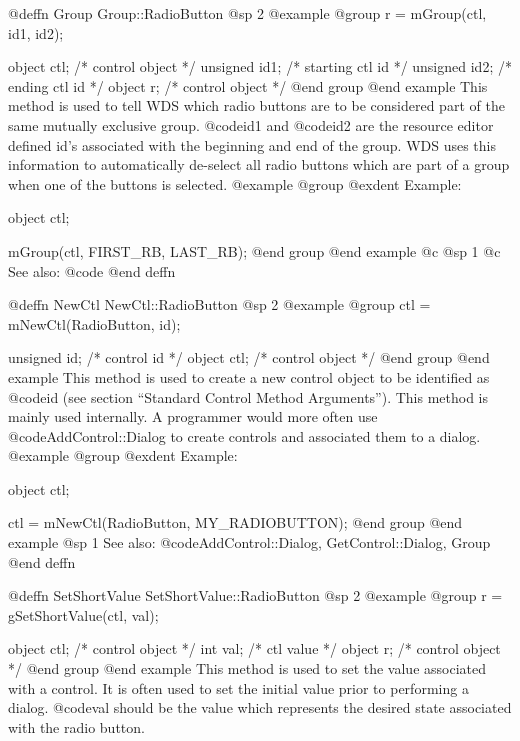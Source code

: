 @deffn {Group} Group::RadioButton
@sp 2
@example
@group
r = mGroup(ctl, id1, id2);

object  ctl;    /*  control object   */
unsigned id1;   /*  starting ctl id  */
unsigned id2;   /*  ending ctl id    */
object  r;      /*  control object   */
@end group
@end example
This method is used to tell WDS which radio buttons are to be considered
part of the same mutually exclusive group.  @code{id1} and @code{id2}
are the resource editor defined id's associated with the beginning and
end of the group.  WDS uses this information to automatically de-select
all radio buttons which are part of a group when one of the buttons is
selected.
@example
@group
@exdent Example:

object  ctl;

mGroup(ctl, FIRST_RB, LAST_RB);
@end group
@end example
@c @sp 1
@c See also:  @code{}
@end deffn











@deffn {NewCtl} NewCtl::RadioButton
@sp 2
@example
@group
ctl = mNewCtl(RadioButton, id);

unsigned  id;   /*  control id      */
object   ctl;   /*  control object  */
@end group
@end example
This method is used to create a new control object to be identified as
@code{id} (see section ``Standard Control Method Arguments'').  This
method is mainly used internally.  A programmer would more often
use @code{AddControl::Dialog} to create controls and associated them
to a dialog.
@example
@group
@exdent Example:

object  ctl;

ctl = mNewCtl(RadioButton, MY_RADIOBUTTON);
@end group
@end example
@sp 1
See also:  @code{AddControl::Dialog, GetControl::Dialog, Group}
@end deffn







@deffn {SetShortValue} SetShortValue::RadioButton
@sp 2
@example
@group
r = gSetShortValue(ctl, val);

object  ctl;    /*  control object  */
int     val;    /*  ctl value       */
object  r;      /*  control object  */
@end group
@end example
This method is used to set the value associated with a control.  It is
often used to set the initial value prior to performing a dialog.
@code{val} should be the value which represents the desired state associated
with the radio button.

